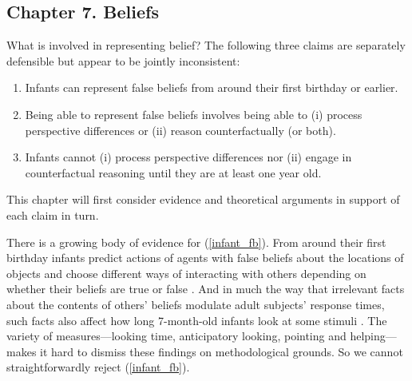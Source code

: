 \documentclass[12pt,\papersize]{extarticle}
\begin{document}
\subsection{Chapter 7. Beliefs}
What is involved in representing belief?
The following three claims are separately defensible but appear to be jointly inconsistent: 
%
\begin{enumerate}
\item Infants can represent false beliefs from around their first birthday or earlier. \label{infant_fb}
%
\item  \label{fb_is_perspectives}  Being able to represent false beliefs involves being able to  (i) process perspective differences or (ii) reason counterfactually (or both).
%
\item Infants cannot (i) process perspective differences nor (ii) engage in counterfactual reasoning until they are at least one year old.  \label{infant_perspectives}
%
\end{enumerate}
%
This chapter will first consider evidence and theoretical arguments in support of each claim in turn.  

There is a growing body of evidence for (\ref{infant_fb}).
From around their first birthday infants  predict actions of agents with false beliefs about the locations of objects \citep[]{Onishi:2005hm, Southgate:2007js}
and choose different ways of interacting with others depending on whether their beliefs are true or false \citep[]{Buttelmann:2009gy,Knudsen:2011fk,southgate:2010fb}.  
And in much the way that irrelevant facts about the contents of others’ beliefs modulate adult subjects’ response times, such facts also affect how long 7-month-old infants look at some stimuli \citep[]{kovacs_social_2010}.
The variety of  measures---looking time, anticipatory looking, pointing and helping---makes it hard to dismiss these findings on methodological grounds.
So we cannot straightforwardly reject (\ref{infant_fb}).
\end{document}
